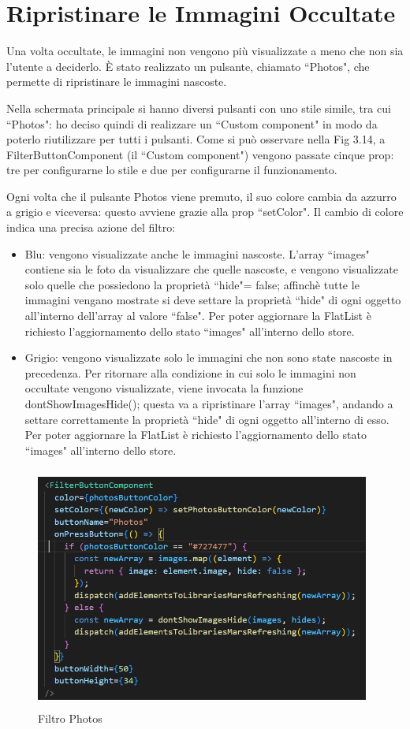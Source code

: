 \section{Ripristinare le Immagini Occultate}
Una volta occultate, le immagini non vengono pi\`u visualizzate a meno che non sia l'utente a deciderlo. \`E stato realizzato un pulsante, chiamato ``Photos", che permette di ripristinare le immagini nascoste.

Nella schermata principale si hanno diversi pulsanti con uno stile simile, tra cui ``Photos": ho deciso quindi di realizzare un ``Custom component" in modo da poterlo riutilizzare per tutti i pulsanti.
Come si pu\`o osservare nella Fig 3.14, a FilterButtonComponent {}(il ``Custom component") vengono passate cinque prop: tre per configurarne lo stile e due per configurarne il funzionamento.

Ogni volta che il pulsante Photos viene premuto, il suo colore cambia da azzurro a grigio e viceversa: questo avviene grazie alla prop ``setColor".
Il cambio di colore indica una precisa azione del filtro:
\begin{itemize}
    \item Blu: vengono visualizzate anche le immagini nascoste. L'array ``images" contiene sia le foto da visualizzare che quelle nascoste, e vengono visualizzate solo quelle che possiedono la propriet\`a ``hide"= false; affinch\`e tutte le immagini vengano mostrate si deve settare la propriet\`a ``hide"
          di ogni oggetto all'interno dell'array al valore ``false". Per poter aggiornare la FlatList \`e richiesto l'aggiornamento dello stato ``images" all'interno dello store.
    \item Grigio: vengono visualizzate solo le immagini che non sono state nascoste in precedenza.
          Per ritornare alla condizione in cui solo le immagini non occultate vengono visualizzate, viene invocata la funzione dontShowImagesHide(); questa va a ripristinare l'array ``images", andando a settare correttamente la propriet\`a ``hide" di ogni oggetto all'interno di esso.
          Per poter aggiornare la FlatList \`e richiesto l'aggiornamento dello stato ``images" all'interno dello store.
\end{itemize}

\begin{figure}[h]
    \centering
    \includegraphics[width=11cm, height=8cm]{images/photoButton.png}
    \caption[differenzeiteot]{Filtro Photos}
    \label{fig:photoButton}
\end{figure}
